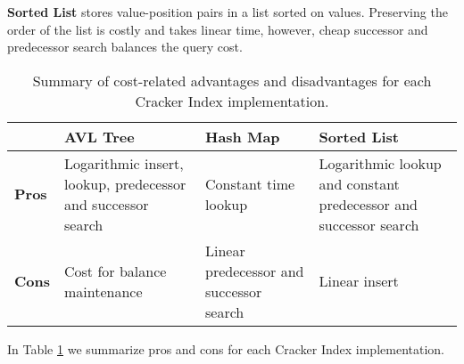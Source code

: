 \textbf{Sorted List} stores value-position pairs in a list sorted on values. Preserving the order of the list is costly and takes linear time, however, cheap successor and predecessor search balances the query cost.

\begin{table}
\begin{tabular}{| m{2em}  | m{2cm} | m{2cm}|  m{2cm} |} 
\hline
 & \textbf{AVL Tree}& \textbf{Hash Map}&\textbf{Sorted List} \\ 
\hline
\textbf{Pros} & Logarithmic insert, lookup, predecessor and successor search & Constant time lookup & Logarithmic lookup and constant predecessor and successor search \\
\hline
\textbf{Cons} & Cost for balance maintenance & Linear predecessor and successor search & Linear insert \\
\hline
\end{tabular}
\caption{Summary of cost-related advantages and disadvantages for each Cracker Index implementation.}
\label{table:implementations}
\end{table}

In Table \ref{table:implementations} we summarize pros and cons for each Cracker Index implementation.
